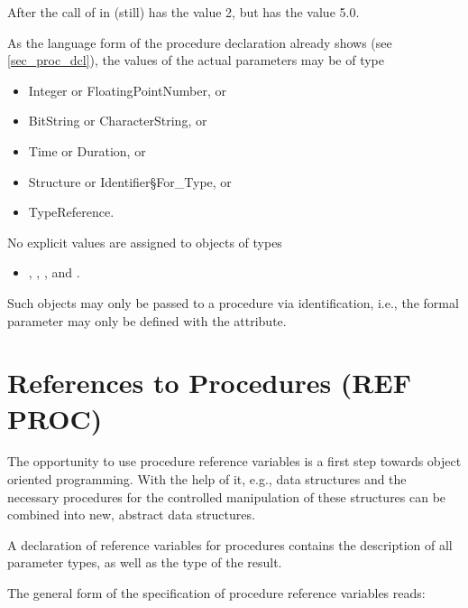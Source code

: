 After the call of  in   (still) has the value 2,
 but  has the
value 5.0.

As the language form of the procedure declaration already shows (see
\ref{sec_proc_dcl}), the values of the actual parameters may be of type
\begin{itemize}
\item Integer or FloatingPointNumber, or
\item BitString or CharacterString, or
\item Time or Duration, or
\item Structure or Identifier\S For\_Type, or
\item TypeReference.
\end{itemize}
No explicit values are assigned to objects of types
\begin{itemize}
\item {}, , ,  and .
\end{itemize}
Such objects may only be passed to a procedure via identification, i.e.,
the formal parameter may only be defined with the  attribute.

\section{References to Procedures (REF PROC)}  %
\label{sec_ref_proc}

The opportunity to use procedure reference variables is a first step
towards object oriented programming. With the help of it, e.g., data
structures and the necessary procedures for the controlled manipulation of
these structures can be combined into new, abstract data structures.

A declaration of reference variables for procedures contains the
description of all parameter types, as well as the type of the result.

\begin{grammarframe}

 
\end{grammarframe}

The general form of the specification of procedure reference variables
reads:

\begin{grammarframe}
 
\end{grammarframe}

